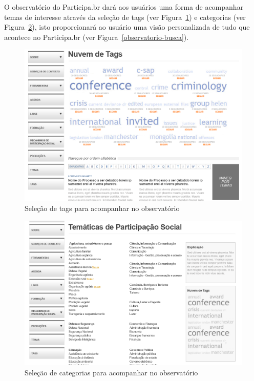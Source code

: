 \documentclass[12pt]{article}
\begin{document}
O observatório do Participa.br dará aos usuários uma forma de acompanhar temas
de interesse através da seleção de tags (ver Figura~\ref{observatorio-tags}) e
categorias (ver Figura~\ref{observatorio-categorias}), isto proporcionará ao
usuário uma visão personalizada de tudo que acontece no Participa.br (ver
Figura~\ref{observatorio-busca}).

\begin{figure}[h]
\center
\includegraphics[scale=0.4]{observatorio-tags.png}
\caption{Seleção de tags para acompanhar no observatório}
\label{observatorio-tags}
\end{figure}

\begin{figure}[h]
\center
\includegraphics[scale=0.4]{observatorio-categorias.png}
\caption{Seleção de categorias para acompanhar no observatório}
\label{observatorio-categorias}
\end{figure}
\end{document}
